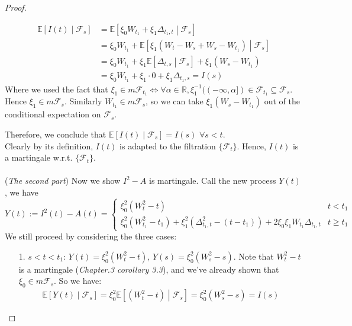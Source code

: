 \documentclass[a4paper, 10pt]{article}
\theoremstyle{definition}
\theoremstyle{hSol}
\begin{document}
\begin{proof}
\begin{itemize}
	\begin{equation}
		\begin{split}
			\mathbb{E}\left[I(t)\middle|\mathcal{F}_s\right] &= \mathbb{E}\left[ \xi_0 W_{t_1} + \xi_1 \Delta_{t_1, t}\middle|\mathcal{F}_s\right] \\
			&=  \xi_0 W_{t_1}  + \mathbb{E}\left[\xi_1 (W_t - W_s + W_s - W_{t_1})\middle|\mathcal{F}_s\right]\\ 
			&= \xi_0 W_{t_1} + \xi_1 \mathbb{E}\left[\Delta_{t,s}\middle|\mathcal{F}_s\right] + \xi_1 (W_s - W_{t_1})\\
			&=\xi_0 W_{t_1} + \xi_1 \cdot 0+ \xi_1 \Delta_{t_1, s} = I(s)
		\end{split}
	\end{equation}
	Where we used the fact that $\xi_1 \in m \mathcal{F}_{t_1} \iff \forall \alpha \in \mathbb{R}, \xi_1^{-1}((-\infty, \alpha]) \in \mathcal{F}_{t_1} \subseteq \mathcal{F}_s$. Hence $\xi_1 \in m \mathcal{F}_s$. Similarly $W_{t_1} \in m \mathcal{F}_{s}$, so we can take $\xi_1(W_s-W_{t_1})$ out of the conditional expectation on $\mathcal{F}_s$.
\end{itemize}
Therefore, we conclude that $\mathbb{E}\left[I(t)\middle|\mathcal{F}_s\right] = I(s)$ $\forall s < t$. \\
Clearly by its definition, $I(t)$ is adapted to the filtration $\{\mathcal{F}_t\}$. Hence, $I(t)$ is a martingale w.r.t. $\{\mathcal{F}_t\}$.\\
~\\
(\textit{The second part}) Now we show $I^2 - A$ is martingale. Call the new process $Y(t)$, we have
\begin{equation}
	Y(t):=I^2(t) - A(t) = \begin{cases}
	\xi_0^2 (W^2_t - t) & t < t_1 \\
	\xi_0^2 (W_{t_1}^2 - t_1) + \xi_1^2 (\Delta_{t_1,t}^2 - (t-t_1)) + 2\xi_0 \xi_1 W_{t_1}\Delta_{t_1, t} & t\geq t_1
	\end{cases}
\end{equation}
We still proceed by considering the three cases:
\begin{itemize}
	\item[1.] $s<t<t_1$: $Y(t)=\xi_0^2 (W^2_t - t)$, $Y(s)=\xi_0^2 (W^2_s - s)$. Note that $W_t^2 - t$ is a martingale (\textit{Chapter.3 corollary 3.3}), and we've already shown that $\xi_0 \in m \mathcal{F}_s$. So we have:
	\begin{equation}
		\begin{split}
			\mathbb{E}\left[Y(t)\middle|\mathcal{F}_s\right] = \xi_0^2\mathbb{E}\left[ (W^2_t - t)\middle|\mathcal{F}_s\right] = \xi_0^2(W^2_s - s) = I(s)

\end{split}
\end{equation}
\end{itemize}
\end{proof}
\end{document}
